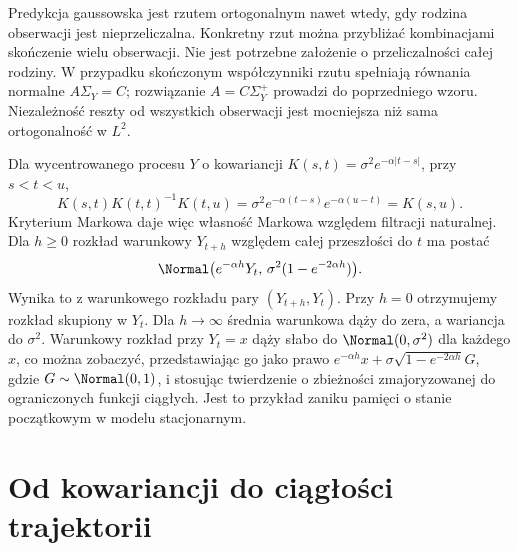\begin{uwaga}
Predykcja gaussowska jest rzutem ortogonalnym nawet wtedy,
gdy rodzina obserwacji jest nieprzeliczalna. Konkretny rzut
można przybliżać kombinacjami skończenie wielu obserwacji.
Nie jest potrzebne założenie o przeliczalności całej
rodziny. W przypadku skończonym współczynniki rzutu
spełniają równania normalne $A\Sigma_Y=C$;
rozwiązanie $A=C\Sigma_Y^+$ prowadzi do poprzedniego
wzoru. Niezależność reszty od wszystkich obserwacji
jest mocniejsza niż sama ortogonalność w $L^2$.
\end{uwaga}

\begin{przyklad}
Dla wycentrowanego procesu $Y$ o kowariancji
$K(s,t)=\sigma^2e^{-\alpha|t-s|}$, przy $s<t<u$,
\[
K(s,t)K(t,t)^{-1}K(t,u)
=\sigma^2e^{-\alpha(t-s)}e^{-\alpha(u-t)}
=K(s,u).
\]
Kryterium Markowa daje więc własność Markowa względem
filtracji naturalnej. Dla $h\ge0$ rozkład warunkowy
$Y_{t+h}$ względem całej przeszłości do $t$ ma postać
\[
\Normal\bigl(e^{-\alpha h}Y_t,\,
\sigma^2(1-e^{-2\alpha h})\bigr).
\]
Wynika to z warunkowego rozkładu pary $(Y_{t+h},Y_t)$.
Przy $h=0$ otrzymujemy rozkład skupiony w $Y_t$.
Dla $h\to\infty$ średnia warunkowa dąży do zera,
a wariancja do $\sigma^2$. Warunkowy rozkład przy
$Y_t=x$ dąży słabo do $\Normal(0,\sigma^2)$
dla każdego $x$, co można zobaczyć, przedstawiając go
jako prawo $e^{-\alpha h}x+\sigma\sqrt{1-e^{-2\alpha h}}G$,
gdzie $G\sim\Normal(0,1)$, i stosując twierdzenie
o zbieżności zmajoryzowanej do ograniczonych funkcji
ciągłych. Jest to przykład zaniku pamięci o stanie
początkowym w modelu stacjonarnym.
\end{przyklad}

\section{Od kowariancji do ciągłości trajektorii}

